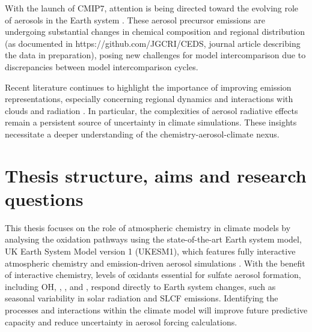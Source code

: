 With the launch of CMIP7, attention is being directed toward the evolving role of aerosols in the Earth system \citep{dunneEvolvingCoupledModel2024}. These aerosol precursor emissions are undergoing substantial changes in chemical composition and regional distribution (as documented in https://github.com/JGCRI/CEDS, journal article describing the data in preparation), posing new challenges for model intercomparison due to discrepancies between model intercomparison cycles.

Recent literature continues to highlight the importance of improving emission representations, especially concerning regional dynamics and interactions with clouds and radiation \citep{bauerTurningPointAerosol2022, persadAerosolsMustBe2022, bellouinBoundingGlobalAerosol2020, wilcoxRegionalAerosolModel2022}. In particular, the complexities of aerosol radiative effects remain a persistent source of uncertainty in climate simulations. These insights necessitate a deeper understanding of the chemistry-aerosol-climate nexus.


\section{Thesis structure, aims and research questions}
\label{ch1:sec:questions}

This thesis focuses on the role of atmospheric chemistry in climate models by analysing the  oxidation pathways using the state-of-the-art Earth system model, UK Earth System Model version 1 (UKESM1), which features fully interactive atmospheric chemistry and emission-driven aerosol simulations \citep{sellarUKESM1DescriptionEvaluation2019,archibaldDescriptionEvaluationUKCA2020}. With the benefit of interactive chemistry, levels of oxidants essential for sulfate aerosol formation, including OH, , , and , respond directly to Earth system changes, such as seasonal variability in solar radiation and SLCF emissions. Identifying the processes and interactions within the climate model will improve future predictive capacity and reduce uncertainty in aerosol forcing calculations. 

